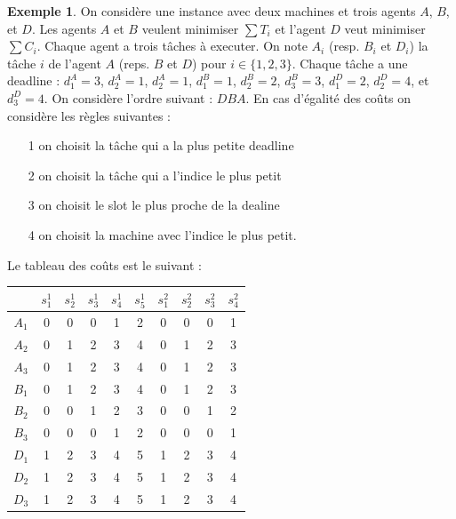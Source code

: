 \documentclass[12pt]{article}
\theoremstyle{definition}
\newtheorem{exemple}{Exemple}
\begin{document}
\begin{exemple}
On considère une instance avec deux machines et trois agents $A$, $B$, et $D$. Les agents $A$ et $B$ veulent minimiser $\sum T_i$ et l'agent $D$ veut minimiser $\sum C_i$. Chaque agent a trois tâches à executer. On note $A_i$ (resp. $B_i$ et $D_i$) la tâche $i$ de l'agent $A$ (reps. $B$ et $D$) pour $i\in \{1, 2, 3\}$. Chaque tâche a une deadline : $d_1^A = 3$, $d_2^A = 1$, $d_2^A = 1$, $d_1^B = 1$, $d_2^B = 2$, $d_3^B = 3$, $d_1^D = 2$, $d_2^D = 4$, et $d_3^D = 4$. On considère l'ordre suivant : $DBA$. En cas d'égalité des coûts on considère les règles suivantes : 
\begin{itemize}
\item[1] on choisit la tâche qui a la plus petite deadline
\item[2] on choisit la tâche qui a l'indice le plus petit
\item[3] on choisit le slot le plus proche de la dealine
\item[4] on choisit la machine avec l'indice le plus petit.
\end{itemize}
Le tableau des coûts est le suivant :

\begin{table}[H]
    \begin{tabular}{|c||c|c|c|c|c||c|c|c|c|}
        \hline
        & $s_1^1$ & $s_2^1$ & $s_3^1$ & $s_4^1$ & $s_5^1$ & $s_1^2$ & $s_2^2$ & $s_3^2$ & $s_4^2$ \\
        \hline 
        $A_1$ & 0 & 0 & 0 & 1 & 2 & 0 & 0 & 0 & 1 \\
        $A_2$ & 0 & 1 & 2 & 3 & 4 & 0 & 1 & 2 & 3 \\
        $A_3$ & 0 & 1 & 2 & 3 & 4 & 0 & 1 & 2 & 3 \\
        \hline
        $B_1$ & 0 & 1 & 2 & 3 & 4 & 0 & 1 & 2 & 3 \\
        $B_2$ & 0 & 0 & 1 & 2 & 3 & 0 & 0 & 1 & 2 \\
        $B_3$ & 0 & 0 & 0 & 1 & 2 & 0 & 0 & 0 & 1 \\
        \hline
        $D_1$ & 1 & 2 & 3 & 4 & 5 & 1 & 2 & 3 & 4 \\
        $D_2$ & 1 & 2 & 3 & 4 & 5 & 1 & 2 & 3 & 4 \\
        $D_3$ & 1 & 2 & 3 & 4 & 5 & 1 & 2 & 3 & 4 \\
        \hline
    \end{tabular}
\end{table}


\end{exemple}
\end{document}

